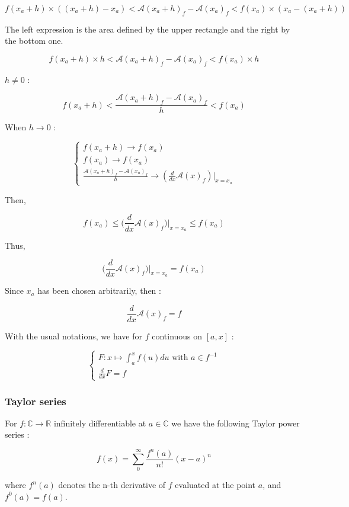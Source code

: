 \documentclass[12pt]{article}
\begin{document}
$$ 
f(x_a +h) \times ( (x_a+h)-x_a) < \mathcal{A}(x_a+h)_f - \mathcal{A}(x_a)_f < f(x_a) \times ( x_a-(x_a+h))
$$

The left expression is the area defined by the upper rectangle and the right by the bottom one.

$$ 
f(x_a +h) \times h < \mathcal{A}(x_a+h)_f - \mathcal{A}(x_a)_f < f(x_a) \times h
$$

$h \neq 0$ :

$$ 
f(x_a +h) < \frac{\mathcal{A}(x_a+h)_f - \mathcal{A}(x_a)_f}{h} < f(x_a)
$$

When $h \rightarrow 0$ :

$$
\begin{cases}
f(x_a +h) \rightarrow f(x_a) \\
f(x_a) \rightarrow f(x_a) \\
\frac{\mathcal{A}(x_a+h)_f - \mathcal{A}(x_a)_f}{h} \rightarrow (\frac{d}{dx} \mathcal{A}(x)_f)|_{x=x_a}
\end{cases}
$$

Then,

$$ 
f(x_a) \leq  \big( \frac{d}{dx} \mathcal{A}(x)_f \big)|_{x=x_a} \leq f(x_a)
$$

Thus,

$$
\big( \frac{d}{dx} \mathcal{A}(x)_f \big)|_{x=x_a} = f(x_a)
$$

Since $x_a$ has been chosen arbitrarily, then :

$$
\frac{d}{dx} \mathcal{A}(x)_f = f
$$

With the usual notations, we have for $f$ continuous on $[a, x]$ :

$$
\begin{cases}
F: x \mapsto \int_a^x f(u)du \text{ with } a \in f^{-1}\\
\frac{d}{dx}F = f
\end{cases}
$$

\subsubsection{Taylor series}

For $f: \mathbb{C} \rightarrow \mathbb{R}$ infinitely differentiable at $a \in \mathbb{C}$ we have the following Taylor power series :

$$
f(x) = \sum_0^\infty  \frac{f^n(a)}{n!} (x-a)^n 
$$

where $f^n(a)$ denotes the n-th derivative of $f$ evaluated at the point $a$, and $f^0(a)=f(a)$.
\end{document}
